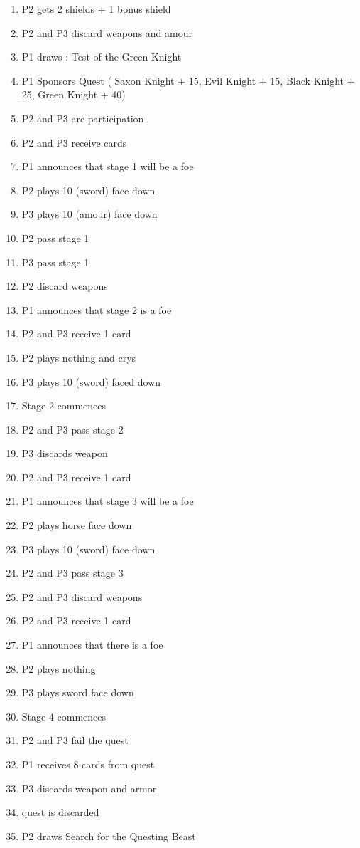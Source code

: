 \documentclass[a4paper,11pt]{article}
\begin{document}
\begin{enumerate}
\item P2 gets 2 shields + 1 bonus shield
\item P2 and P3 discard weapons and amour
\item P1 draws : Test of the Green Knight
\item P1 Sponsors Quest ( Saxon Knight + 15, Evil Knight + 15, Black Knight + 25, Green Knight + 40) 
\item P2 and P3 are participation 
\item P2 and P3 receive cards
\item P1 announces that stage 1 will be a foe
\item P2 plays 10 (sword) face down
\item P3 plays 10 (amour) face down
\item P2  pass stage 1 
\item P3  pass stage 1
\item P2 discard weapons
\item P1 announces that stage 2 is a foe
\item P2 and P3 receive 1 card
\item P2 plays nothing and crys
\item P3 plays 10 (sword) faced down
\item Stage 2 commences 
\item P2 and P3 pass stage 2
\item P3 discards weapon
\item P2 and P3 receive 1 card
\item P1 announces that stage 3 will be a foe
\item P2 plays horse face down
\item P3 plays 10 (sword) face down 
\item P2 and P3 pass stage 3
\item P2 and P3 discard weapons
\item P2 and P3 receive 1 card
\item P1 announces that there is a foe
\item P2 plays nothing
\item P3 plays sword face down 
\item Stage 4 commences 
\item P2 and P3 fail the quest
\item P1 receives 8 cards from quest 
\item P3 discards weapon and armor
\item quest is discarded
\item P2 draws Search for the Questing Beast

\end{enumerate}
\end{document}
